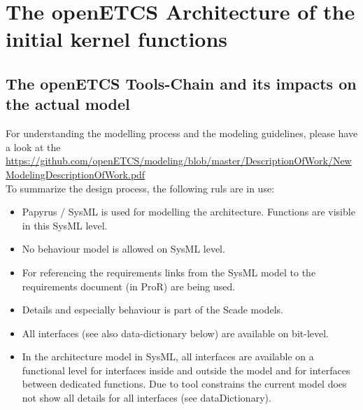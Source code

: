 \documentclass{template/openetcs_article}
\begin{document}
\section{The openETCS Architecture of the initial kernel functions}

\subsection{The openETCS Tools-Chain and its impacts on the actual model}

For understanding the modelling process and the modeling guidelines, please have a look at the \url{https://github.com/openETCS/modeling/blob/master/DescriptionOfWork/NewModelingDescriptionOfWork.pdf}\\

To summarize the design process, the following ruls are in use:
\begin{itemize}
\item Papyrus / SysML is used for modelling the architecture. Functions are visible in this SysML level.
\item No behaviour model is allowed on SysML level.
\item For referencing the requirements links from the SysML model to the requirements document (in ProR) are being used.
\item Details and especially behaviour is part of the Scade models.
\item All interfaces (see also data-dictionary below) are available on bit-level.
\item In the architecture model in SysML, all interfaces are available on a functional level for interfaces inside and outside the model and for interfaces between dedicated functions. Due to tool constrains the current model does not show all details for all interfaces (see dataDictionary).

\end{itemize}
\end{document}
